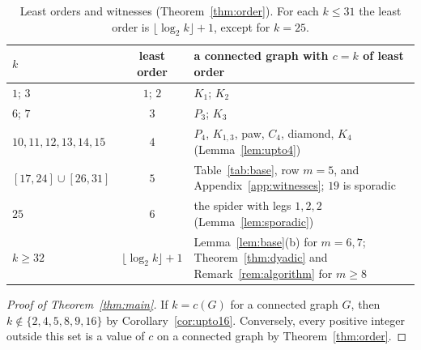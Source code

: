 \documentclass[11pt]{amsart}
\theoremstyle{definition}
\theoremstyle{remark}
\begin{document}
\begin{table}[ht]
\centering
\small
\begin{tabular}{lcl}
\toprule
$k$ & least order & a connected graph with $c=k$ of least order\\
\midrule
$1$; $3$ & $1$; $2$ & $K_1$; $K_2$\\
$6$; $7$ & $3$ & $P_3$; $K_3$\\
$10,11,12,13,14,15$ & $4$ & $P_4$, $K_{1,3}$, paw, $C_4$, diamond, $K_4$ (Lemma~\ref{lem:upto4})\\
$[17,24]\cup[26,31]$ & $5$ & Table~\ref{tab:base}, row $m=5$, and Appendix~\ref{app:witnesses}; $19$ is sporadic\\
$25$ & $6$ & the spider with legs $1,2,2$ (Lemma~\ref{lem:sporadic})\\
$k\ge32$ & $\lfloor\log_2k\rfloor+1$ & Lemma~\ref{lem:base}(b) for $m=6,7$; Theorem~\ref{thm:dyadic} and Remark~\ref{rem:algorithm} for $m\ge8$\\
\bottomrule
\end{tabular}
\caption{Least orders and witnesses (Theorem~\ref{thm:order}). For each $k\le31$ the least order is $\lfloor\log_2k\rfloor+1$, except for $k=25$.}
\label{tab:leastorder}
\end{table}

\begin{proof}[Proof of Theorem~\ref{thm:main}]
If $k=c(G)$ for a connected graph $G$, then $k\notin\{2,4,5,8,9,16\}$ by Corollary~\ref{cor:upto16}. Conversely, every positive integer outside this set is a value of $c$ on a connected graph by Theorem~\ref{thm:order}.
\end{proof}
\end{document}
